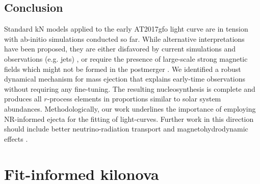 \subsection{Conclusion}

Standard kN models applied to the early AT2017gfo light curve are in
tension with ab-initio simulations conducted so far.
While alternative interpretations have been proposed, they are either
disfavored by current simulations and observations (e.g. jets) \citep{Bromberg:2017crh,Duffell:2018iig},
or require the presence of large-scale strong magnetic 
fields which might not be formed in the postmerger
\citep{Metzger:2018uni,Fernandez:2018kax,Radice:2018ghv,Ciolfi:2019fie}. 
We identified a robust dynamical mechanism for mass ejection that
explains early-time observations without requiring any fine-tuning.
The resulting nucleosynthesis is complete and produces all
$r$-process elements in proportions similar to solar system abundances.
Methodologically, our work underlines the importance of employing
NR-informed ejecta for the fitting of light-curves.
Further work in this direction should 
include better neutrino-radiation transport and magnetohydrodynamic effects
\citep{Siegel:2017nub,Fujibayashi:2017puw,Radice:2018xqa,Radice:2018pdn,Miller:2019dpt}. 





\section{Fit-informed kilonova}

